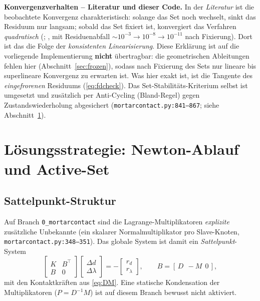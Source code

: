 \documentclass[a4paper,11pt]{article}
\def\bm#1{#1}%
\newcommand{\code}[1]{\texttt{\small #1}}
\newcommand{\file}[1]{\texttt{\small #1}}
\let\stdsection\section
\renewcommand{\section}{\clearpage\stdsection}
\begin{document}
\medskip
\noindent\textbf{Konvergenzverhalten -- Literatur und dieser Code.} In der \emph{Literatur} ist die
beobachtete Konvergenz charakteristisch: solange das Set noch wechselt, sinkt das Residuum nur
langsam; sobald das Set fixiert ist, konvergiert das Verfahren \emph{quadratisch}
(\citealp[S.~560]{gitterle}; \citealp[Tab.~4.1]{farah}, mit Residuenabfall
$\sim10^{-3}\!\to\!10^{-8}\!\to\!10^{-11}$ nach Fixierung). Dort ist das die Folge der
\emph{konsistenten Linearisierung}. Diese Erklärung ist auf die vorliegende Implementierung
\textbf{nicht} übertragbar: die geometrischen Ableitungen fehlen hier
(Abschnitt~\ref{sec:frozen}), sodass nach Fixierung des Sets nur lineare bis superlineare
Konvergenz zu erwarten ist. Was hier exakt ist, ist die Tangente des \emph{eingefrorenen}
Residuums (\eqref{eq:fdcheck}). Das Set-Stabilitäts-Kriterium selbst ist umgesetzt und
zusätzlich per Anti-Cycling (Bland-Regel) gegen Zustandswiederholung abgesichert
(\file{mortarcontact.py:\allowbreak{}841--867}; siehe Abschnitt~\ref{sec:loesung}).

\section{Lösungsstrategie: Newton-Ablauf und Active-Set}
\label{sec:loesung}

\subsection{Sattelpunkt-Struktur}
Auf Branch \code{0\_mortarcontact} sind die Lagrange-Multiplikatoren \emph{explizite} zusätzliche
Unbekannte (ein skalarer Normalmultiplikator pro Slave-Knoten,
\file{mortarcontact.py:\allowbreak{}348--351}). Das globale System ist damit ein \emph{Sattelpunkt}-System
\begin{equation}
\begin{bmatrix} \bm K & \bm B^\top \\ \bm B & \bm 0 \end{bmatrix}
\begin{bmatrix} \Delta\bm d \\ \Delta\bm\lambda \end{bmatrix}
= -\begin{bmatrix} \bm r_d \\ \bm r_\lambda \end{bmatrix},
\qquad \bm B = [\,\bm D\ \ -\bm M\ \ \bm 0\,],
\end{equation}
mit den Kontaktkräften aus \eqref{eq:DM}. Eine statische Kondensation der Multiplikatoren
($\bm P=\bm D^{-1}\bm M$) ist auf diesem Branch bewusst nicht aktiviert.
\end{document}
